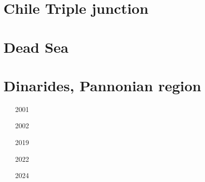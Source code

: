 \section{Chile Triple junction}

\begin{small}
\begin{itemize}
\item[\twothousandeight] 
\item[\twothousandtwelve] 
\item[\twothousandtwentythree] 
\end{itemize}
\end{small}


\section{Dead Sea} 

\begin{small}
\begin{itemize}
\item[\twothousandfive]
\item[\twothousandeleven]
\item[\twothousandtwentyfour]
\end{itemize}
\end{small}

\section{Dinarides, Pannonian region} 

\begin{small}
\begin{itemize}
\item[2001]
\item[2002]
\item[2019]
\item[2022]
\item[2024]
\end{itemize}
\end{small}

